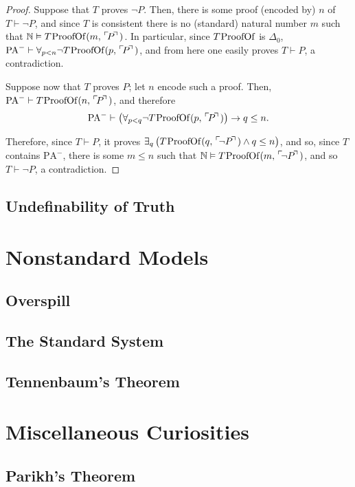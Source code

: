 \documentclass{article}
\theoremstyle{nonumberplain}
\newtheorem{proof}{Proof}
\newcommand{\N}{\mathbb{N}}
\newcommand{\PA}{\mathrm{PA}}
\newcommand{\WPA}{\PA^-}
\DeclareMathOperator{\ProofOf}{\mspace{-2mu}ProofOf}
\newcommand{\gn}[1]{\setbox0=\hbox{$\mathclap{\phantom{t}}#1$} \dimen0=\ht0 \advance\dimen0 by -1.25ex \,\raise\dimen0\hbox{$\ulcorner$} \! \box0 \! \raise\dimen0\hbox{$\urcorner$}\,}
\begin{document}
\begin{proof}
Suppose that $T$ proves $\neg P$. Then, there is some proof (encoded by) $n$ of $T \vdash \neg P$, and since $T$ is consistent there is no (standard) natural number $m$ such that $\N \vDash T\ProofOf(m, \gn{P})$. In particular, since $T\ProofOf$ is $\Delta_0$, $\WPA \vdash \forall_{p < n} \neg T\ProofOf(p,\gn{P})$, and from here one easily proves $T \vdash P$, a contradiction.

Suppose now that $T$ proves $P$; let $n$ encode such a proof. Then, $\WPA \vdash T\ProofOf(n,\gn{P})$, and therefore
\begin{equation}
\WPA \vdash \left( \forall_{p<q} \neg T\ProofOf(p,\gn P) \right) \rightarrow q \leq n.
\end{equation}

Therefore, since $T \vdash P$, it proves $\exists_q \left( T\ProofOf(q,\gn{\neg P}) \land q \leq n \right)$, and so, since $T$ contains $\WPA$, there is some $m \leq n$ such that $\N \vDash T\ProofOf(m, \gn{\neg P})$, and so $T \vdash \neg P$, a contradiction.
\end{proof}

\subsection{Undefinability of Truth}\label{sec:tarski}

\section{Nonstandard Models}\label{sec:nonstd}

\subsection{Overspill}

\subsection{The Standard System}

\subsection{Tennenbaum's Theorem}

\section{Miscellaneous Curiosities}

\subsection{Parikh's Theorem}

%
%
\end{document}
